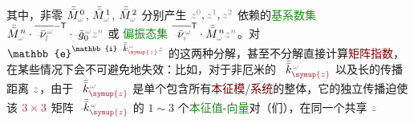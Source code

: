 其中，非零 $\bar{\bar{M}}_{\mathcolor{gray}{\omega}}^{\;\! 0}$, $\bar{\bar{M}}_{\mathcolor{gray}{\omega}}^{\;\! 1}$, $\bar{\bar{M}}_{\mathcolor{gray}{\omega}}^{\;\! 2}$ 分别产生 $\mathcolor{gray}{z^0}, \mathcolor{gray}{z^1}, \mathcolor{gray}{z^2}$ 依赖的\textcolor{ForestGreen}{基系数集} $\bar{\bar{M}}_{\mathcolor{gray}{\omega}}^{\;\! n} \cdot \overline{\Xint{\begin{smallmatrix} ~ \\ {}^{}_{\mathcolor{gray}{-}} \\ ~ \end{smallmatrix}}{15}{\bar{\nu}}^{\;\!\mathcolor{gray}{\omega}}_{\textcolor{ForestGreen}{l}}}^{-{\mathsf{T}}} \cdot \Xint{{}^{}_{\mathcolor{gray}{-}}}{10}{\bar{g}}^{\;\!\mathcolor{gray}{\omega}}_0 \mathcolor{gray}{z^n}$ 或 \textcolor{ForestGreen}{偏振态集} $\overline{\Xint{\begin{smallmatrix} ~ \\ {}^{}_{\mathcolor{gray}{-}} \\ ~ \end{smallmatrix}}{15}{\bar{\nu}}^{\;\!\mathcolor{gray}{\omega}}_{\textcolor{ForestGreen}{\imath}}}^\mathsf{T} \cdot \bar{\bar{M}}_{\mathcolor{gray}{\omega}}^{\;\! n} \mathcolor{gray}{z^n}$。对 $\mathbb{e}^{\mathbb{i} \Xint{\begin{smallmatrix} ~ \\ {}^{}_{\mathcolor{gray}{-}} \\ ~ \end{smallmatrix}}{15}{\bar{\bar{k}}}_{\textcolor{Maroon}{\symup{z}}}^{\;\! \mathcolor{gray}{\omega}} \mathcolor{gray}{z}}$ 的这两种分解，甚至不分解直接计算\textcolor{Maroon}{矩阵指数}，在某些情况下会不可避免地失效：比如，对于非厄米的 $\Xint{\begin{smallmatrix} ~ \\ {}^{}_{\mathcolor{gray}{-}} \\ ~ \end{smallmatrix}}{15}{\bar{\bar{k}}}_{\textcolor{Maroon}{\symup{z}}}^{\;\! \mathcolor{gray}{\omega}}$ 以及长的传播距离 $\mathcolor{gray}{z}$，由于 $\Xint{\begin{smallmatrix} ~ \\ {}^{}_{\mathcolor{gray}{-}} \\ ~ \end{smallmatrix}}{15}{\bar{\bar{k}}}_{\textcolor{Maroon}{\symup{z}}}^{\;\! \mathcolor{gray}{\omega}}$ 是单个包含所有\textcolor{Maroon}{本征模}/\textcolor{Maroon}{系统}的整体，它的独立传播迫使该 $\textcolor{Maroon}{3 \times 3}$ 矩阵 $\Xint{\begin{smallmatrix} ~ \\ {}^{}_{\mathcolor{gray}{-}} \\ ~ \end{smallmatrix}}{15}{\bar{\bar{k}}}_{\textcolor{Maroon}{\symup{z}}}^{\;\! \mathcolor{gray}{\omega}}$ 的 $1\sim3$ 个\textcolor{ForestGreen}{本征值}-\textcolor{ForestGreen}{向量}对（们），在同一个共享 $\mathcolor{gray}{z}$ 